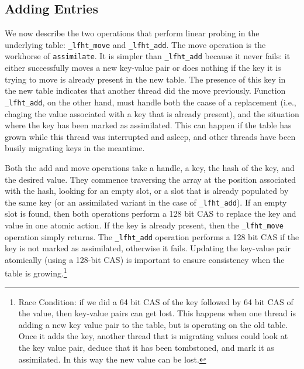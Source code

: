 \subsection{Adding Entries}

We now describe the two operations that perform linear probing in the
underlying table: \texttt{\_lfht\_move} and \texttt{\_lfht\_add}. The
move operation is the workhorse of \texttt{assimilate}. It is simpler
than \texttt{\_lfht\_add} because it never fails: it either
successfully moves a new key-value pair or does nothing if the key it
is trying to move is already present in the new table. The presence of
this key in the new table indicates that another thread did the move
previously. Function \texttt{\_lfht\_add}, on the other hand, must
handle both the caase of a replacement (i.e., chaging the value
associated with a key that is already present), and the situation
where the key has been marked as assimilated.  This can happen if the
table has grown while this thread was interrupted and asleep, and
other threads have been busily migrating keys in the meantime.

Both the add and move operations take a handle, a key, the hash of the
key, and the desired value. They commence traversing the array at the
position associated with the hash, looking for an empty slot, or a
slot that is already populated by the same key (or an assimilated
variant in the case of \texttt{\_lfht\_add}). If an empty slot is
found, then both operations perform a 128 bit CAS to replace the key
and value in one atomic action.  If the key is already present, then
the \texttt{\_lfht\_move} operation simply returns. The
\texttt{\_lfht\_add} operation performs a 128 bit CAS if the key is
not marked as assimilated, otherwise it fails. Updating the key-value
pair atomically (using a 128-bit CAS) is important to ensure
consistency when the table is growing.\footnote{Race Condition: if we
  did a 64 bit CAS of the key followed by 64 bit CAS of the value,
  then key-value pairs can get lost.  This happens when one thread is
  adding a new key value pair to the table, but is operating on the
  old table. Once it adds the key, another thread that is migrating
  values could look at the key value pair, deduce that it has been
  tombstoned, and mark it as assimilated. In this way the new value
  can be lost.}





